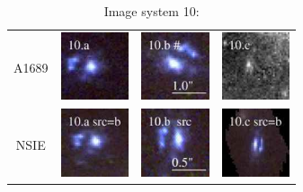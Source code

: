 \documentclass[useAMS,usenatbib]{mn2e}
\begin{document}
\begin{table}
  \caption{Image system 10:}\vspace{0mm}
  \begin{tabular}{cccc}
    \multicolumn{1}{m{1cm}}{{\Large A1689}}
    & \multicolumn{1}{m{1.7cm}}{\includegraphics[height=2.00cm,clip]{figs/nsie_img/rgb.img_10_a.ps}}
    & \multicolumn{1}{m{1.7cm}}{\includegraphics[height=2.00cm,clip]{figs/nsie_img/rgb.img_10_b.ps}}
    & \multicolumn{1}{m{1.7cm}}{\includegraphics[height=2.00cm,clip]{figs/nsie_img/eF775outac_sub.img_10_c.ps}} \\
    \multicolumn{1}{m{1cm}}{{\Large NSIE}}
    & \multicolumn{1}{m{1.7cm}}{\includegraphics[height=2.00cm,clip]{figs/nsie_img/rgb.pre_10_a_b_tri.ps}}
    & \multicolumn{1}{m{1.7cm}}{\includegraphics[height=2.00cm,clip]{figs/nsie_img/rgb.src_10_b.ps}}
    & \multicolumn{1}{m{1.7cm}}{\includegraphics[height=2.00cm,clip]{figs/nsie_img/rgb.pre_10_c_b_tri.ps}} \\

\end{tabular}
\end{table}
\end{document}
